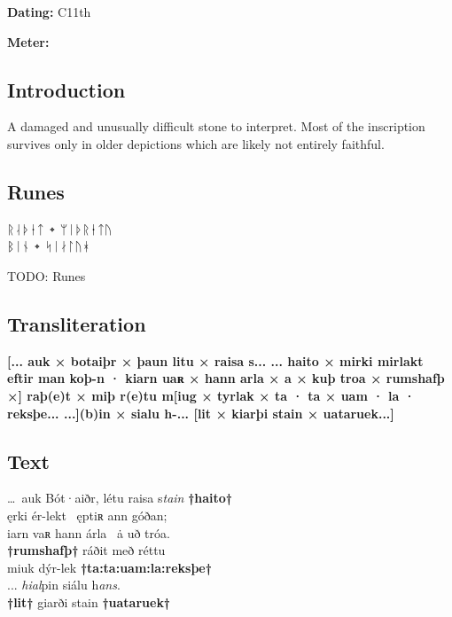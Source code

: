 \begin{flushright}%
\textbf{Dating:} C11th

\textbf{Meter:} \Fornyrdislag
\end{flushright}%

\subsection{Introduction}

A damaged and unusually difficult stone to interpret.  Most of the inscription survives only in older depictions which are likely not entirely faithful.

\subsection{Runes}

ᚱᛆᚦᚽᛏ ᛭ ᛘᛁᚦᚱᚽᛏᚢ \\
ᛒᛁᚾ ᛭ ᛋᛁᛅᛚᚢᚼ

TODO: Runes%

\subsection{Transliteration}

\textbf{[... auk × botaiþr × þaun litu × raisa s... ... haito × mirki mirlakt eftir man koþ-n · kiarn uaʀ × hann arla × a × kuþ troa × rumshafþ ×] raþ(e)t × miþ r(e)tu m[iug × tyrlak × ta · ta × uam · la · reksþe... ...](b)in × sialu h-... [lit × kiarþi stain × uataruek...]}

\subsection{Text}

\bpg\bpa[0]%
\startsub \dots\ auk Bót·aiðr,  létu raisa s\emph{tain} \textbf{†haito†}\endsub \\
ęrki ér-lekt \hld\ ęptiʀ ann góðan; \\
iarn vaʀ hann árla \hld\ ȧ uð tróa. \\
\textbf{†rumshafþ†} ráðit með réttu \\
miuk dýr-lek \textbf{†ta:ta:uam:la:reksþe†} \\
\startsub ... \emph{hial}pin siálu h\emph{ans}. \\
\textbf{†lit†} giarði stain \textbf{†uataruek†}\endsub\epa


